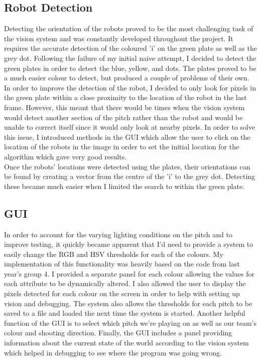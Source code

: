 \documentclass[dvips]{article}
\begin{document}
\subsection{Robot Detection}
Detecting the orientation of the robots proved to be the most challenging task of the vision system
and was constantly developed throughout the project. It requires the accurate detection of the
coloured 'i' on the green plate as well as the grey dot. Following the failure of my initial naive
attempt, I decided to detect the green plates in order to detect the blue, yellow, and dots.
The plates proved to be a much easier colour to detect, but produced a couple of problems of their own.
In order to improve the detection of the robot, I decided to only look for pixels in the green
plate within a close proximity to the location of the robot in the last frame. However, this
meant that there would be times when the vision system would detect another section of the pitch
rather than the robot and would be unable to correct itself since it would only look at nearby pixels.
In order to solve this issue, I introduced methods in the GUI which allow the user to click on
the location of the robots in the image in order to set the initial location for the algorithm which
gave very good results.\\

Once the robots' locations were detected using the plates, their orientations can be found by
creating a vector from the centre of the 'i' to the grey dot. Detecting these became much easier
when I limited the search to within the green plate.

\subsection{GUI}
In order to account for the varying lighting conditions on the pitch and to improve testing,
it quickly became apparent that I'd need to provide a system to easily change the RGB and HSV
thresholds for each of the colours. My implementation of this functionality was heavily based on
the code from last year's group 4. I provided a separate panel for each colour allowing the values
for each attribute to be dynamically altered. I also allowed the user to display the pixels detected
for each colour on the screen in order to help with setting up vision and debugging. The system
also allows the thresholds for each pitch to be saved to a file and loaded the next time the
system is started. Another helpful function of the GUI is to select which pitch we're playing on
as well as our team's colour and shooting direction. Finally, the GUI includes a panel providing
information about the current state of the world according to the vision system which helped
in debugging to see where the program was going wrong.
\end{document}
